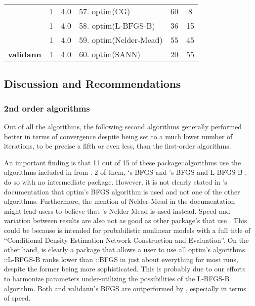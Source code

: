 \begin{Schunk}
\begin{table}
\begin{tabular}[t]{>{}lcclcc}
 & 1 & 4.0 & 57. optim(CG) & 60 & 8\\

 & 1 & 4.0 & 58. optim(L-BFGS-B) & 36 & 15\\

 & 1 & 4.0 & 59. optim(Nelder-Mead) & 55 & 45\\

\multirow{-5}{*}{\raggedright\arraybackslash \textbf{validann}} & 1 & 4.0 & 60. optim(SANN) & 20 & 55\\
\bottomrule
\end{tabular}
\end{table}

\end{Schunk}

\hypertarget{discussion-and-recommendations}{%
\subsection{Discussion and
Recommendations}\label{discussion-and-recommendations}}

\hypertarget{nd-order-algorithms}{%
\subsubsection{2nd order algorithms}\label{nd-order-algorithms}}

Out of all the algorithms, the following second algorithms generally
performed better in terms of convergence despite being set to a much
lower number of iterations, to be precise a fifth or even less, than the
first-order algorithms.

An important finding is that 11 out of 15 of these package::algorithms
use the algorithms included in  from . 2 of
them, `s BFGS \citep{R-CaDENCE} and
's BFGS and L-BFGS-B \citep{R-validann}, do so with no
intermediate package. However, it is not clearly stated in
's documentation that optim's BFGS algorithm is used
and not one of the other algorithms. Furthermore, the mention of
Nelder-Mead in the documentation might lead users to believe that
's Nelder-Mead is used instead. Speed and variation between
results are also not as good as other package's that use .
This could be because  is intended for probabilistic
nonlinear models with a full title of ``Conditional Density Estimation
Network Construction and Evaluation''. On the other hand,
 is clearly a package that allows a user to use all
optim's algorithms. ::L-BFGS-B ranks lower than
::BFGS in just about everything for most runs, despite
the former being more sophisticated. This is probably due to our efforts
to harmonize parameters under-utilizing the possibilities of the
L-BFGS-B algorithm. Both  and validann's BFGS are
outperformed by , especially in terms of speed.

